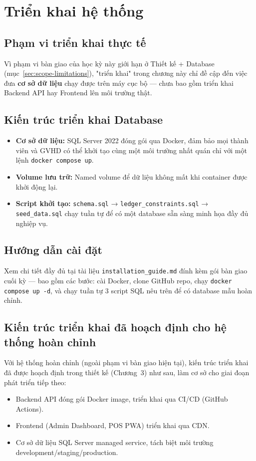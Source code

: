 \section{Triển khai hệ thống}

\subsection{Phạm vi triển khai thực tế}
Vì phạm vi bàn giao của học kỳ này giới hạn ở Thiết kế + Database (mục~\ref{sec:scope-limitations}), "triển khai" trong chương này chỉ đề cập đến việc đưa \textbf{cơ sở dữ liệu} chạy được trên máy cục bộ — chưa bao gồm triển khai Backend API hay Frontend lên môi trường thật.

\subsection{Kiến trúc triển khai Database}
\begin{itemize}
    \item \textbf{Cơ sở dữ liệu:} SQL Server 2022 đóng gói qua Docker, đảm bảo mọi thành viên và GVHD có thể khởi tạo cùng một môi trường nhất quán chỉ với một lệnh \texttt{docker compose up}.
    \item \textbf{Volume lưu trữ:} Named volume để dữ liệu không mất khi container được khởi động lại.
    \item \textbf{Script khởi tạo:} \texttt{schema.sql} → \texttt{ledger\_constraints.sql} → \texttt{seed\_data.sql} chạy tuần tự để có một database sẵn sàng minh họa đầy đủ nghiệp vụ.
\end{itemize}

\subsection{Hướng dẫn cài đặt}
Xem chi tiết đầy đủ tại tài liệu \texttt{installation\_guide.md} đính kèm gói bàn giao cuối kỳ — bao gồm các bước: cài Docker, clone GitHub repo, chạy \texttt{docker compose up -d}, và chạy tuần tự 3 script SQL nêu trên để có database mẫu hoàn chỉnh.

\subsection{Kiến trúc triển khai đã hoạch định cho hệ thống hoàn chỉnh}
Với hệ thống hoàn chỉnh (ngoài phạm vi bàn giao hiện tại), kiến trúc triển khai đã được hoạch định trong thiết kế (Chương~3) như sau, làm cơ sở cho giai đoạn phát triển tiếp theo:
\begin{itemize}
    \item Backend API đóng gói Docker image, triển khai qua CI/CD (GitHub Actions).
    \item Frontend (Admin Dashboard, POS PWA) triển khai qua CDN.
    \item Cơ sở dữ liệu SQL Server managed service, tách biệt môi trường development/staging/production.
\end{itemize}
